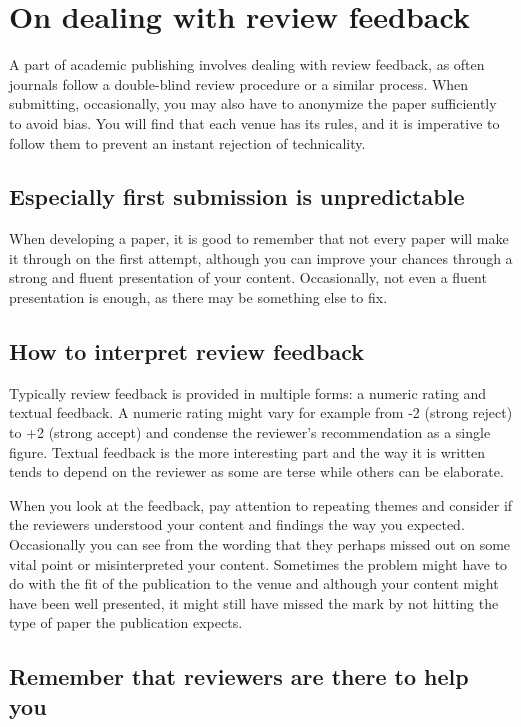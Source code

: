 \section{On dealing with review feedback}

A part of academic publishing involves dealing with review feedback, as often journals follow a double-blind review procedure or a similar process. When submitting, occasionally, you may also have to anonymize the paper sufficiently to avoid bias.
You will find that each venue has its rules, and it is imperative to follow them to prevent an instant rejection of technicality.

\subsection{Especially first submission is unpredictable}

When developing a paper, it is good to remember that not every paper will make it through on the first attempt, although you can improve your chances through a strong and fluent presentation of your content.
Occasionally, not even a fluent presentation is enough, as there may be something else to fix.

\subsection{How to interpret review feedback}

Typically review feedback is provided in multiple forms: a numeric rating and textual feedback.
A numeric rating might vary for example from -2 (strong reject) to +2 (strong accept) and condense the reviewer's recommendation as a single figure.
Textual feedback is the more interesting part and the way it is written tends to depend on the reviewer as some are terse while others can be elaborate.

When you look at the feedback, pay attention to repeating themes and consider if the reviewers understood your content and findings the way you expected.
Occasionally you can see from the wording that they perhaps missed out on some vital point or misinterpreted your content.
Sometimes the problem might have to do with the fit of the publication to the venue and although your content might have been well presented, it might still have missed the mark by not hitting the type of paper the publication expects.

\subsection{Remember that reviewers are there to help you}

